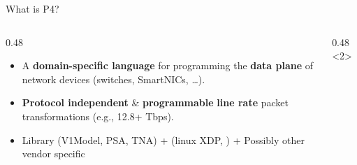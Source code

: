 \documentclass[aspectratio=169]{beamer}
\begin{document}
\begin{frame}{What is P4? }
    \begin{columns}[T]
        
        \begin{column}{0.48\textwidth}
            \begin{itemize}\setlength\itemsep{8pt}
                \item A \textbf{domain-specific language} for programming the \textbf{data plane} of network devices (switches, SmartNICs, \dots).
                \item \textbf{Protocol independent} \& \textbf{programmable} \textbf{line rate} packet transformations (e.g., 12.8+ Tbps).
                \item Library (V1Model, PSA, TNA) + (linux XDP,  ) + Possibly other vendor specific 
             \end{itemize}
        \end{column}
        
        \begin{column}{0.48\textwidth}
        <2>
        \end{column}
        
    \end{columns}
\end{frame}


\end{document}
